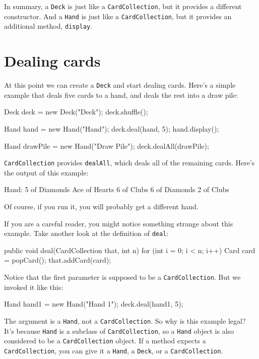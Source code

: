 \documentclass[12pt]{book}
\theoremstyle{exercise}
\newcommand{\java}[1]{\verb"#1"}
\begin{document}
In summary, a \java{Deck} is just like a \java{CardCollection}, but it provides a different constructor.
And a \java{Hand} is just like a \java{CardCollection}, but it provides an additional method, \java{display}.


\section{Dealing cards}

At this point we can create a \java{Deck} and start dealing cards.
Here's a simple example that deals five cards to a hand, and deals the rest into a draw pile:

\begin{code}
        Deck deck = new Deck("Deck");
        deck.shuffle();

        Hand hand = new Hand("Hand");
        deck.deal(hand, 5);
        hand.display();

        Hand drawPile = new Hand("Draw Pile");
        deck.dealAll(drawPile);
\end{code}

\java{CardCollection} provides \java{dealAll}, which deals all of the remaining cards.
Here's the output of this example:

\begin{stdout}
Hand:
5 of Diamonds
Ace of Hearts
6 of Clubs
6 of Diamonds
2 of Clubs
\end{stdout}

Of course, if you run it, you will probably get a different hand.

If you are a careful reader, you might notice something strange about this example.
Take another look at the definition of \java{deal}:

\begin{code}
    public void deal(CardCollection that, int n) {
        for (int i = 0; i < n; i++) {
            Card card = popCard();
            that.addCard(card);
        }
    }
\end{code}

Notice that the first parameter is supposed to be a \java{CardCollection}.
But we invoked it like this:

\begin{code}
    Hand hand1 = new Hand("Hand 1");
    deck.deal(hand1, 5);
\end{code}

The argument is a \java{Hand}, not a \java{CardCollection}.
So why is this example legal?
It's because \java{Hand} is a subclass of \java{CardCollection}, so a \java{Hand} object is also considered to be a \java{CardCollection} object.
If a method expects a \java{CardCollection}, you can give it a \java{Hand}, a \java{Deck}, or a \java{CardCollection}.
\end{document}
